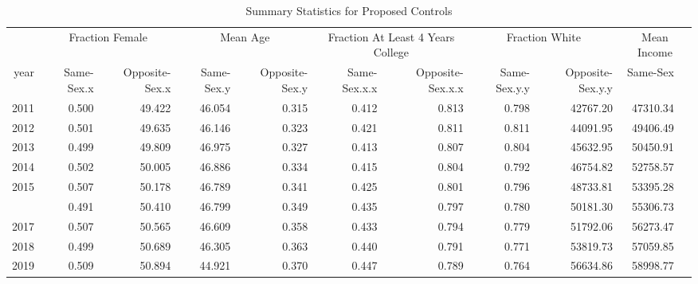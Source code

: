\begin{table}

\caption{Summary Statistics for Proposed Controls}
\centering
\begin{tabular}[t]{rrrrrrrrrr}
\toprule
\multicolumn{1}{c}{ } & \multicolumn{2}{c}{Fraction Female} & \multicolumn{2}{c}{Mean Age} & \multicolumn{2}{c}{Fraction At Least 4 Years College} & \multicolumn{2}{c}{Fraction White} & \multicolumn{2}{c}{Mean Income} \\
\cmidrule(l{3pt}r{3pt}){2-3} \cmidrule(l{3pt}r{3pt}){4-5} \cmidrule(l{3pt}r{3pt}){6-7} \cmidrule(l{3pt}r{3pt}){8-9} \cmidrule(l{3pt}r{3pt}){10-11}
year & Same-Sex.x & Opposite-Sex.x & Same-Sex.y & Opposite-Sex.y & Same-Sex.x.x & Opposite-Sex.x.x & Same-Sex.y.y & Opposite-Sex.y.y & Same-Sex\\
\midrule
2011 & 0.500 & 49.422 & 46.054 & 0.315 & 0.412 & 0.813 & 0.798 & 42767.20 & 47310.34\\
2012 & 0.501 & 49.635 & 46.146 & 0.323 & 0.421 & 0.811 & 0.811 & 44091.95 & 49406.49\\
2013 & 0.499 & 49.809 & 46.975 & 0.327 & 0.413 & 0.807 & 0.804 & 45632.95 & 50450.91\\
2014 & 0.502 & 50.005 & 46.886 & 0.334 & 0.415 & 0.804 & 0.792 & 46754.82 & 52758.57\\
2015 & 0.507 & 50.178 & 46.789 & 0.341 & 0.425 & 0.801 & 0.796 & 48733.81 & 53395.28\\
\addlinespace
2016 & 0.491 & 50.410 & 46.799 & 0.349 & 0.435 & 0.797 & 0.780 & 50181.30 & 55306.73\\
2017 & 0.507 & 50.565 & 46.609 & 0.358 & 0.433 & 0.794 & 0.779 & 51792.06 & 56273.47\\
2018 & 0.499 & 50.689 & 46.305 & 0.363 & 0.440 & 0.791 & 0.771 & 53819.73 & 57059.85\\
2019 & 0.509 & 50.894 & 44.921 & 0.370 & 0.447 & 0.789 & 0.764 & 56634.86 & 58998.77\\
\bottomrule
\end{tabular}
\end{table}
